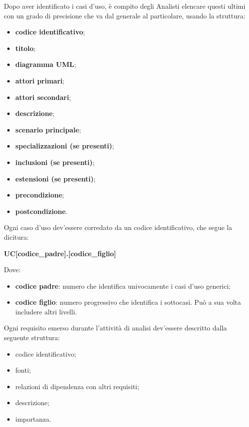 		Dopo aver identificato i casi d'uso, è compito degli Analisti elencare questi ultimi con un grado di precisione che va dal generale al particolare, usando la struttura:
		\begin{itemize}
	    	\item{\textbf{codice identificativo}};
	    	\item{\textbf{titolo}};
	    	\item{\textbf{diagramma UML}};
	    	\item{\textbf{attori primari}};
	    	\item{\textbf{attori secondari}};
	    	\item{\textbf{descrizione}};
	    	\item{\textbf{scenario principale}};
    		\item{\textbf{specializzazioni (se presenti)}};
	    	\item{\textbf{inclusioni (se presenti)}};
	    	\item{\textbf{estensioni (se presenti)}};
	    	\item{\textbf{precondizione}};
	    	\item{\textbf{postcondizione}}.
		\end{itemize}

		\noindent Ogni caso d'uso dev'essere corredato da un codice identificativo, che segue la dicitura:
		\begin{center}
			\textbf{UC[codice\_padre].[codice\_figlio]}
		\end{center}

		\noindent Dove:
		\begin{itemize}
         	\item{\textbf{codice padre}: numero che identifica univocamente i casi d'uso generici;}
         	\item{\textbf{codice figlio}: numero progressivo che identifica i sottocasi. Può a sua volta includere altri livelli.}
		\end{itemize}

		Ogni requisito emerso durante l'attività di analisi dev'essere descritto dalla seguente struttura:
           	\begin{itemize}
                  	\item{codice identificativo;}
                  	\item{fonti;}
                  	\item{relazioni di dipendenza con altri requisiti;}
                  	\item{descrizione;}
                  	\item{importanza.}
    			\end{itemize}

